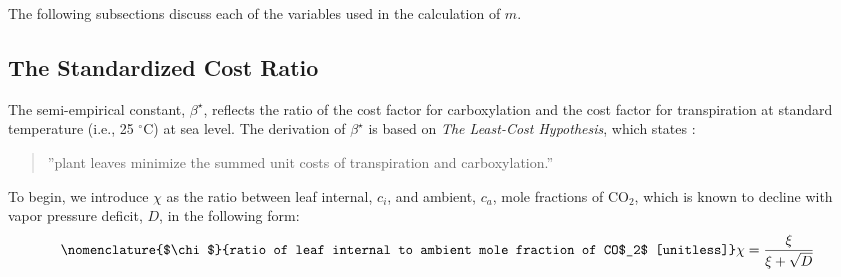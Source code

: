 \noindent The following subsections discuss each of the variables used in the calculation of $m$.

\subsection{The Standardized Cost Ratio}
\label{sec:beta}
%
The semi-empirical constant, $\beta^\star$, reflects the ratio of the cost factor for carboxylation and the cost factor for transpiration at standard temperature (i.e., 25 ${}^\circ$C) at sea level. The derivation of $\beta^\star$ is based on \emph{The Least-Cost Hypothesis}, which states \parencite{prentice14}:
\begin{quote}
	''plant leaves minimize the summed unit costs of transpiration and carboxylation.''
\end{quote}
To begin, we introduce $\chi$ as the ratio between leaf internal, $c_i$, and ambient, $c_a$, mole fractions of CO$_2$, which is known to decline with vapor pressure deficit, $D$, in the following form:
\begin{equation}
\nomenclature{$\chi$}{ratio of leaf internal to ambient mole fraction of CO$_2$ [unitless]}%
\label{eq:chi}
    \chi = \frac{\xi}{\xi + \sqrt{D}}
\end{equation}

